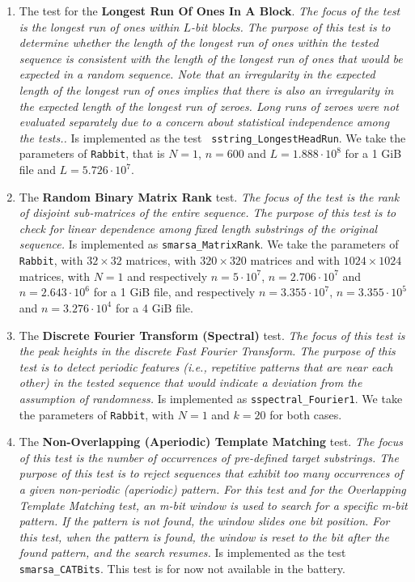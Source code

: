 \begin{enumerate}
\item The test for the {\bf Longest Run Of Ones In A Block}. \textit{The focus
  of the test is the longest run of ones within $L$-bit blocks. The purpose of
this test is to determine whether the length of the longest run of ones within
the tested sequence is consistent with the length of the longest run of ones
that would be expected in a random sequence. Note that an irregularity in the
expected length of the longest run of ones implies that there is also an
irregularity in the expected length of the longest run of zeroes. Long runs of
zeroes were not evaluated separately due to a concern about statistical
independence among the tests..} Is implemented as the test {\tt
sstring\_LongestHeadRun}. We take the parameters of {\tt Rabbit}, that is $N=1$,
$n=600$ and $L = 1.888\cdot10^8$ for a 1 GiB file and $L = 5.726\cdot10^7$.

\item The {\bf Random Binary Matrix Rank} test. \textit{The focus of the test is
  the rank of disjoint sub-matrices of the entire sequence. The purpose of this
test is to check for linear dependence among fixed length substrings of the
original sequence.} Is implemented as {\tt smarsa\_MatrixRank}. We take the
parameters of {\tt Rabbit}, with $32 \times 32$ matrices, with $320 \times 320$
matrices and with $1024 \times 1024$ matrices, with $N = 1$ and respectively
$n=5\cdot 10^7$, $n=2.706\cdot 10^7$ and $n=2.643\cdot10^6$ for a 1 GiB file,
and respectively $n=3.355\cdot10^7$, $n=3.355\cdot10^5$ and $n=3.276\cdot10^4$
for a 4 GiB file.

\item The {\bf Discrete Fourier Transform (Spectral)} test. \textit{The focus of
  this test is the peak heights in the discrete Fast Fourier Transform. The
purpose of this test is to detect periodic features (i.e., repetitive patterns
that are near each other) in the tested sequence that would indicate a deviation
from the assumption of randomness.} Is implemented as {\tt sspectral\_Fourier1}.
We take the parameters of {\tt Rabbit}, with $N=1$ and $k=20$ for both cases.

\item The {\bf Non-Overlapping (Aperiodic) Template Matching} test. \textit{The
  focus of this test is the number of occurrences of pre-defined target
substrings. The purpose of this test is to reject sequences that exhibit too
many occurrences of a given non-periodic (aperiodic) pattern. For this test and
for the Overlapping Template Matching test, an m-bit window is used to search
for a specific m-bit pattern. If the pattern is not found, the window slides one
bit position. For this test, when the pattern is found, the window is reset to
the bit after the found pattern, and the search resumes.} Is implemented as the
test {\tt smarsa\_CATBits}. This test is for now not available in the battery.


\end{enumerate}
